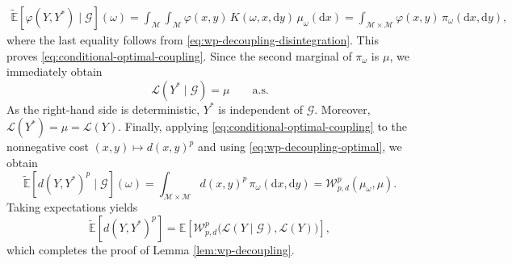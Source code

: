 \documentclass[11pt,letterpaper]{article}
\theoremstyle{plain}
\theoremstyle{definition}
\theoremstyle{remark}
\newcommand{\E}{\mathbb{E}}
\newcommand{\W}{\mathcal{W}}
\begin{document}
\begin{align*}
    \widetilde{\E}\!\left[
        \varphi(Y,Y^*)
        \mid\mathcal G
    \right](\omega)
    =
    \int_{\mathcal M}
    \int_{\mathcal M}
    \varphi(x,y)\,
    K(\omega,x,\mathrm dy)\,
    \mu_\omega(\mathrm dx) =
    \int_{\mathcal M\times\mathcal M}
    \varphi(x,y)\,
    \pi_\omega(\mathrm dx,\mathrm dy),
\end{align*}
where the last equality follows from
\eqref{eq:wp-decoupling-disintegration}. This proves
\eqref{eq:conditional-optimal-coupling}. Since the second marginal of $\pi_\omega$ is $\mu$, we immediately obtain
\[
    \mathcal L(Y^*\mid\mathcal G)
    =
    \mu
    \qquad\text{a.s.}
\]
As the right-hand side is deterministic, $Y^*$ is independent of
$\mathcal G$. Moreover, $\mathcal L(Y^*)
    =
    \mu
    =
    \mathcal L(Y).$ Finally, applying \eqref{eq:conditional-optimal-coupling} to the
nonnegative cost $(x,y)\mapsto d(x,y)^p$ and using
\eqref{eq:wp-decoupling-optimal}, we obtain
\[
    \widetilde{\E}\!\left[
        d(Y,Y^*)^p
        \mid\mathcal G
    \right](\omega)
    =
    \int_{\mathcal M\times\mathcal M}
    d(x,y)^p\,
    \pi_\omega(\mathrm dx,\mathrm dy) =
    \W_{p,d}^p(\mu_\omega,\mu).
\]
Taking expectations yields
\[
    \widetilde{\E}\!\left[d(Y,Y^*)^p\right]
    =
    \E\left[
        \W_{p,d}^p\bigl(
            \mathcal L(Y\mid\mathcal G),
            \mathcal L(Y)
        \bigr)
    \right],
\]
which completes the proof of Lemma \ref{lem:wp-decoupling}.
\end{document}
